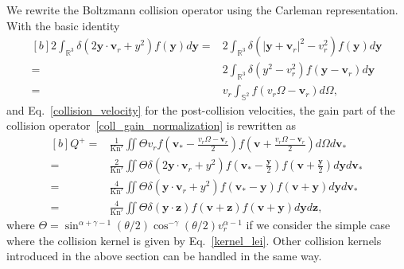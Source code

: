 We rewrite the Boltzmann collision operator using the Carleman representation. With the basic identity
\begin{equation*}
\begin{aligned}[b]
2\int_{\mathbb{R}^{3}}\delta(2\bm{y}\cdot{\bm{v}_r}+y^2)f(\bm{y})d\bm{y}=&2\int_{\mathbb{R}^{3}}\delta(|\bm{y}+\bm{v}_r|^2-v^2_r)f(\bm{y})d\bm{y}\\
=&2\int_{\mathbb{R}^{3}}\delta(y^2-v^2_r)f(\bm{y}-\bm{v}_r)d\bm{y}\\
 =&{v_r}\int_{\mathbb{S}^{2}}f(v_r\Omega-\bm{v}_r)d\Omega,
\end{aligned}
\end{equation*} 
and Eq.~\eqref{collision_velocity} for the post-collision velocities, the gain part of the collision operator~\eqref{coll_gain_normalization} is rewritten as
\begin{equation}\label{Boltzmann_gain_FSM}
\begin{aligned}[b]
 Q^+
=&\frac{1}{\text{Kn}'}\iint\Theta{v_r}
  f\left(\bm{v}_{\ast}-\frac{v_r\Omega-\bm{v}_r}{2}\right)f\left(\bm{v}+\frac{v_r\Omega-\bm{v}_r}{2}\right)d\Omega d{\bm{v}}_\ast \\
=&\frac{2}{\text{Kn}'}\iint\Theta\delta(2\bm{y}\cdot{\bm{v}_r}+y^2)
  f\left(\bm{v}_{\ast}-\frac{\bm{y}}{2}\right)f\left(\bm{v}+\frac{\bm{y}}{2}\right) d\bm{y} d{\bm{v}}_\ast \\
=&\frac{4}{\text{Kn}'}\iint\Theta\delta(\bm{y}\cdot{\bm{v}_r   }+y^2)
  f(\bm{v}_{\ast}-\bm{y})f(\bm{v}+\bm{y}) d\bm{y} d{\bm{v}}_\ast \\
=&\frac{4}{\text{Kn}'}\iint\Theta\delta(\bm{y}\cdot{}\bm{z  })
  f(\bm{v}+\bm{z})f(\bm{v}+\bm{y}) d\bm{\bm{y}} d\bm{\bm{z}},
 \end{aligned}
\end{equation}
where
$\Theta=\sin^{\alpha+\gamma-1}\left({\theta}/{2}\right)\cos^{-\gamma}\left({\theta}/{2}\right)v_r^{\alpha-1}$  if we consider the simple case where the collision kernel is given by Eq.~\eqref{kernel_lei}. Other collision kernels introduced in the above section can be handled in the same way. 


